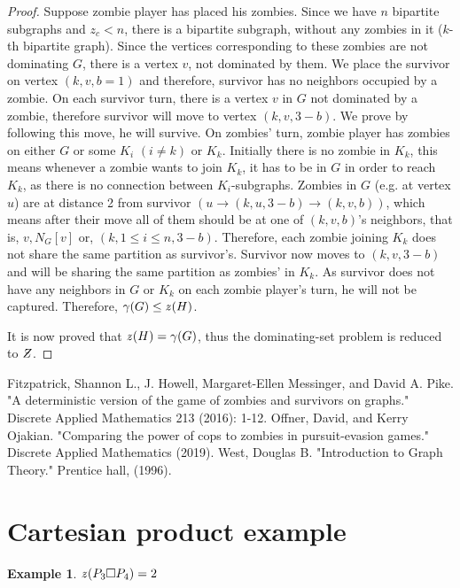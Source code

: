 \documentclass[1p]{elsarticle}
\newtheorem{example}[theorem]{Example}
\newcommand{\NPZ}{\ooalign{$Z$\cr\hfil\rule[.8ex]{.3em}{.09ex}\hfil\cr}}
\newcommand{\zn}{\ooalign{$z$\cr\hfil\rule[.5ex]{.2em}{.08ex}\hfil\cr}}
\begin{document}
\begin{proof}
		Suppose zombie player has placed his zombies. Since we have $n$ bipartite subgraphs and $z_c < n$, there is a
		bipartite subgraph, without any zombies in it ($k$-th bipartite graph). Since the vertices corresponding to
		these zombies are not dominating $G$, there is a vertex $v$, not dominated by them. We place the survivor on
		vertex $(k,v,b = 1)$ and therefore, survivor has no neighbors occupied by a zombie. On each survivor turn, there
		is a vertex $v$ in $G$ not dominated by a zombie, therefore survivor will move to vertex $(k,v,3 - b)$. We prove
		by following this move, he will survive. On zombies' turn, zombie player has zombies on either $G$ or some $K_i$
		$(i \neq k)$ or $K_k$. Initially there is no zombie in $K_k$, this means whenever a zombie wants to join $K_k$,
		it has to be in $G$ in order to reach $K_k$, as there is no connection between $K_i$-subgraphs. Zombies in $G$
		(e.g. at vertex $u$) are at distance 2 from survivor $(u \rightarrow (k,u,3 - b) \rightarrow (k,v,b))$, which
		means after their move all of them should be at one of $(k,v,b)$'s neighbors, that is, $v , N_G[v] $ or, $ (k,1
		\leq i \leq n,3 - b)$. Therefore, each zombie joining $K_k$ does not share the same partition as survivor's.
		Survivor now moves to $(k,v,3-b)$ and will be sharing the same partition as zombies' in $K_k$. As survivor does
		not have any neighbors in $G$ or $K_k$ on each zombie player's turn, he will not be captured. Therefore,
		$\gamma(G) \leq \zn(H)$.

		It is now proved that $\zn(H) = \gamma(G)$, thus the dominating-set problem is reduced to $\NPZ$.

	\end{proof}
\begin{thebibliography}{999}
	
	Fitzpatrick, Shannon L., J. Howell, Margaret-Ellen Messinger, and David A. Pike. "A deterministic version of the
	game of zombies and survivors on graphs." Discrete Applied Mathematics 213 (2016): 1-12.
	Offner, David, and Kerry Ojakian. "Comparing the power of cops to zombies in pursuit-evasion games." Discrete
	Applied Mathematics (2019).
	West, Douglas B. "Introduction to Graph Theory." Prentice hall, (1996).
\end{thebibliography}

\newpage
\appendix
\section{Cartesian product example} \label{cartesianProductExample}
\begin{example} $\zn(P_3 \square P_4 ) = 2$
\end{example}
\end{document}
